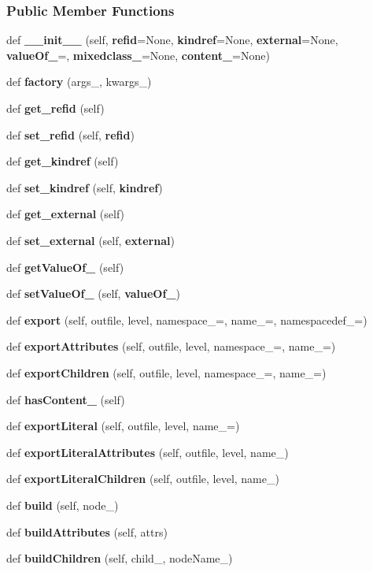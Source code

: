 \subsubsection*{Public Member Functions}
\begin{DoxyCompactItemize}
\item 
def {\bf \+\_\+\+\_\+init\+\_\+\+\_\+} (self, {\bf refid}=None, {\bf kindref}=None, {\bf external}=None, {\bf value\+Of\+\_\+}=\textquotesingle{}\textquotesingle{}, {\bf mixedclass\+\_\+}=None, {\bf content\+\_\+}=None)
\item 
def {\bf factory} (args\+\_\+, kwargs\+\_\+)
\item 
def {\bf get\+\_\+refid} (self)
\item 
def {\bf set\+\_\+refid} (self, {\bf refid})
\item 
def {\bf get\+\_\+kindref} (self)
\item 
def {\bf set\+\_\+kindref} (self, {\bf kindref})
\item 
def {\bf get\+\_\+external} (self)
\item 
def {\bf set\+\_\+external} (self, {\bf external})
\item 
def {\bf get\+Value\+Of\+\_\+} (self)
\item 
def {\bf set\+Value\+Of\+\_\+} (self, {\bf value\+Of\+\_\+})
\item 
def {\bf export} (self, outfile, level, namespace\+\_\+=\textquotesingle{}\textquotesingle{}, name\+\_\+=\textquotesingle{}, namespacedef\+\_\+=\textquotesingle{}\textquotesingle{})
\item 
def {\bf export\+Attributes} (self, outfile, level, namespace\+\_\+=\textquotesingle{}\textquotesingle{}, name\+\_\+=\textquotesingle{})
\item 
def {\bf export\+Children} (self, outfile, level, namespace\+\_\+=\textquotesingle{}\textquotesingle{}, name\+\_\+=\textquotesingle{})
\item 
def {\bf has\+Content\+\_\+} (self)
\item 
def {\bf export\+Literal} (self, outfile, level, name\+\_\+=\textquotesingle{})
\item 
def {\bf export\+Literal\+Attributes} (self, outfile, level, name\+\_\+)
\item 
def {\bf export\+Literal\+Children} (self, outfile, level, name\+\_\+)
\item 
def {\bf build} (self, node\+\_\+)
\item 
def {\bf build\+Attributes} (self, attrs)
\item 
def {\bf build\+Children} (self, child\+\_\+, node\+Name\+\_\+)
\end{DoxyCompactItemize}
